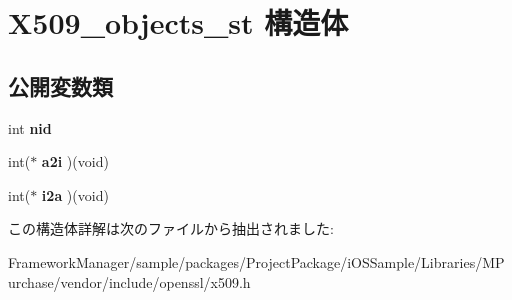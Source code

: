 \hypertarget{struct_x509__objects__st}{}\section{X509\+\_\+objects\+\_\+st 構造体}
\label{struct_x509__objects__st}
\subsection*{公開変数類}
\begin{DoxyCompactItemize}
\item 
\hypertarget{struct_x509__objects__st_a8f3f79c1037e355813b601c2c9c4d019}{}int {\bfseries nid}\label{struct_x509__objects__st_a8f3f79c1037e355813b601c2c9c4d019}

\item 
\hypertarget{struct_x509__objects__st_a6b2bfa8ee8cf1a8acc1add5d1f3940ef}{}int($\ast$ {\bfseries a2i} )(void)\label{struct_x509__objects__st_a6b2bfa8ee8cf1a8acc1add5d1f3940ef}

\item 
\hypertarget{struct_x509__objects__st_a7e32841a9585320493acee913eb32ae6}{}int($\ast$ {\bfseries i2a} )(void)\label{struct_x509__objects__st_a7e32841a9585320493acee913eb32ae6}

\end{DoxyCompactItemize}


この構造体詳解は次のファイルから抽出されました\+:\begin{DoxyCompactItemize}
\item 
Framework\+Manager/sample/packages/\+Project\+Package/i\+O\+S\+Sample/\+Libraries/\+M\+Purchase/vendor/include/openssl/x509.\+h\end{DoxyCompactItemize}
